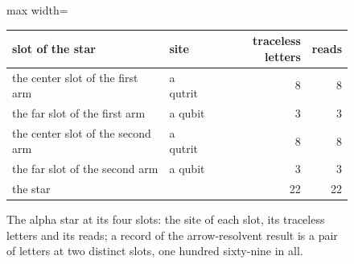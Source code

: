 \begin{figure}[h]\centering
\begin{adjustbox}{max width=\linewidth}\begin{tabular}{llrr}\toprule
slot of the star & site & traceless letters & reads \\ \midrule
the center slot of the first arm & a qutrit & 8 & 8 \\
the far slot of the first arm & a qubit & 3 & 3 \\
the center slot of the second arm & a qutrit & 8 & 8 \\
the far slot of the second arm & a qubit & 3 & 3 \\ \midrule
the star & & 22 & 22 \\ \bottomrule
\end{tabular}\end{adjustbox}
\caption{The alpha star at its four slots: the site of each slot, its traceless letters and its reads; a record of the arrow-resolvent result is a pair of letters at two distinct slots, one hundred sixty-nine in all.}
\end{figure}
